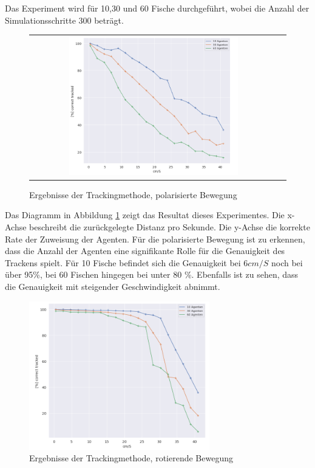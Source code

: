 Das Experiment wird für 10,30 und 60 Fische durchgeführt, wobei die Anzahl der Simulationsschritte 300 beträgt.


\begin{figure}[H]
\centering
\begin{tabular}{cc}
\includegraphics[width=0.7\textwidth]{figures/Experimente/Tracking/Testcaste_pol.png} 

\end{tabular}
\caption{Ergebnisse der Trackingmethode, polarisierte Bewegung\label{fig:TrackingStudyPOL}  }
\end{figure}
Das Diagramm in Abbildung \ref{fig:TrackingStudyPOL} zeigt das Resultat dieses Experimentes.
Die x-Achse beschreibt die zurückgelegte Distanz pro Sekunde. Die y-Achse die korrekte Rate der Zuweisung der Agenten.
Für die polarisierte Bewegung ist zu erkennen, dass die Anzahl der Agenten eine signifikante Rolle für die Genauigkeit des Trackens spielt. Für 10 Fische befindet sich die Genauigkeit bei $6 cm/S$ noch bei über 95\%, bei 60 Fischen hingegen bei unter 80 \%. Ebenfalls ist zu sehen, dass die Genauigkeit mit steigender Geschwindigkeit abnimmt.

\begin{figure}[H]
\centering
\includegraphics[width=0.7\textwidth]{figures/Experimente/Tracking/Testcaste_mil.png} 
\caption{Ergebnisse der Trackingmethode, rotierende Bewegung\label{fig:TrackingStudyMIL}  }
\end{figure}

